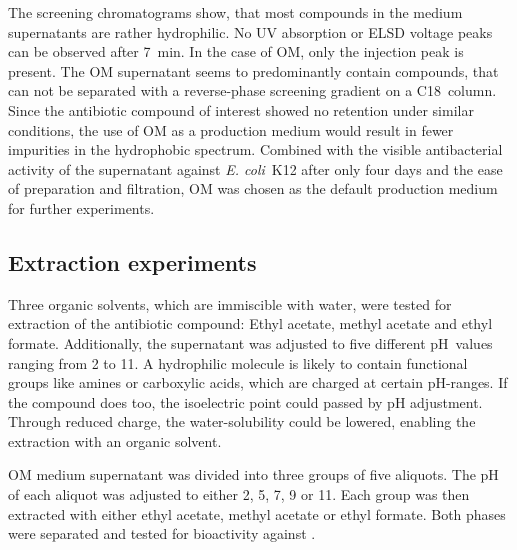 The screening chromatograms show, that most compounds in the medium supernatants are rather hydrophilic.
No UV absorption or ELSD voltage peaks can be observed after \SI{7}{\minute}.
In the case of OM, only the injection peak is present.
The OM supernatant seems to predominantly contain compounds, that can not be separated with a reverse-phase screening gradient on a C18~column.
Since the antibiotic compound of interest showed no retention under similar conditions, the use of OM as a production medium would result in fewer impurities in the hydrophobic spectrum.
Combined with the visible antibacterial activity of the supernatant against \textit{E. coli}~K12 after only four days and the ease of preparation and filtration, OM was chosen as the default production medium for further experiments.

\subsection{Extraction experiments}
\label{sub:extraction_experiments}

Three organic solvents, which are immiscible with water, were tested for extraction of the antibiotic compound:
Ethyl acetate, methyl acetate and ethyl formate.
Additionally, the supernatant was adjusted to five different pH~values ranging from 2 to 11.
A hydrophilic molecule is likely to contain functional groups like amines or carboxylic acids, which are charged at certain pH-ranges. If the compound does too, the isoelectric point could passed by pH adjustment.
Through reduced charge, the water-solubility could be lowered, enabling the extraction with an organic solvent.

OM medium supernatant was divided into three groups of five aliquots.
The pH of each aliquot was adjusted to either 2, 5, 7, 9 or 11. 
Each group was then extracted with either ethyl acetate, methyl acetate or ethyl formate. 
Both phases were separated and tested for bioactivity against \coli.

